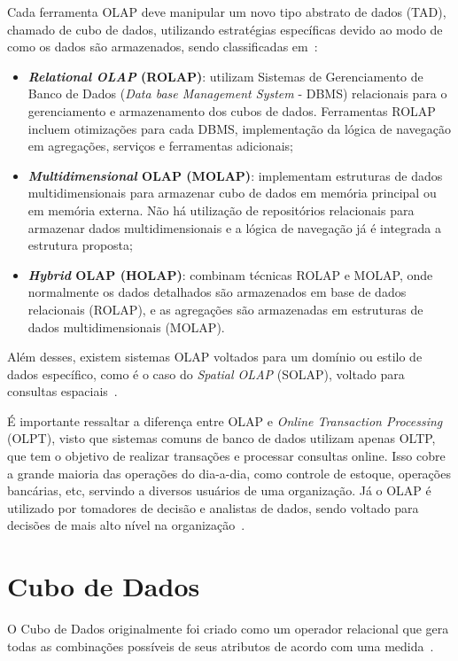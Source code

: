 Cada ferramenta OLAP deve manipular um novo tipo abstrato de dados (TAD), chamado de cubo de dados, utilizando estratégias específicas devido ao modo de como os dados são armazenados, sendo classificadas em~\cite{moreiraFullPartialData2012}:

\begin{itemize}
	\item \textbf{\textit{Relational OLAP} (ROLAP)}: utilizam Sistemas de Gerenciamento de Banco de Dados (\textit{Data base Management System} - DBMS) relacionais para o gerenciamento e armazenamento dos cubos de dados.
Ferramentas ROLAP incluem otimizações para cada DBMS, implementação da lógica de navegação em agregações, serviços e ferramentas adicionais;
	\item \textbf{\textit{Multidimensional} OLAP (MOLAP)}: implementam estruturas de dados multidimensionais para armazenar cubo de dados em memória principal ou em memória externa.
Não há utilização de repositórios relacionais para armazenar dados multidimensionais e a lógica de navegação já é integrada a estrutura proposta;
	\item \textbf{\textit{Hybrid} OLAP (HOLAP)}: combinam técnicas ROLAP e MOLAP, onde normalmente os dados detalhados são armazenados em base de dados relacionais (ROLAP), e as agregações são armazenadas em estruturas de dados multidimensionais (MOLAP).
\end{itemize}

Além desses, existem sistemas OLAP voltados para um domínio ou estilo de dados específico, como é o caso do \textit{Spatial OLAP} (SOLAP), voltado para consultas espaciais~\cite{viswanathanUsercentricSpatialData2014}.

É importante ressaltar a diferença entre OLAP e \textit{Online Transaction Processing} (OLPT), visto que sistemas comuns de banco de dados utilizam apenas OLTP, que tem o objetivo de realizar transações e processar consultas online.
Isso cobre a grande maioria das operações do dia-a-dia, como controle de estoque, operações bancárias, etc, servindo a diversos usuários de uma organização.
Já o OLAP é utilizado por tomadores de decisão e analistas de dados, sendo voltado para decisões de mais alto nível na organização~\cite{hanDataMiningConcepts2011}.

\section{Cubo de Dados}
\label{ch:fun:cube}

O Cubo de Dados originalmente foi criado como um operador relacional que gera todas as combinações possíveis de seus atributos de acordo com uma medida~\cite{grayDataCubeRelational1996}.


